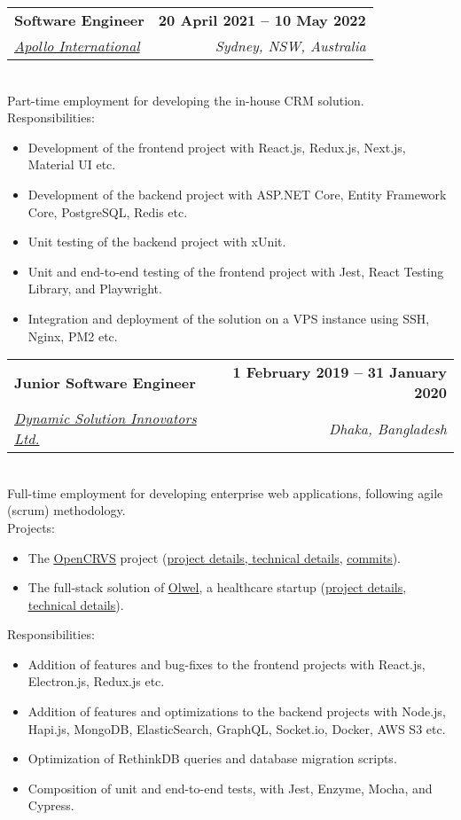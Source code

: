 \documentclass[11pt,a4paper]{article}
\makeatletter
\newcommand{\resumeItem}[1]{
  \item{
    {#1 \vspace{-2pt}}
  }
}
\newcommand{\resumeSubheading}[4]{
  \vspace{-2pt}\item
    \begin{tabular*}{1.0\textwidth}[t]{l@{\extracolsep{\fill}}r}
      \textbf{#1} & \textbf{\small #2} \\
      \textit{\small#3} & \textit{\small #4} \\
    \end{tabular*}\vspace{-7pt}
}
\newcommand{\resumeItemListStart}{\begin{itemize}}
\newcommand{\resumeItemListEnd}{\end{itemize}\vspace{-5pt}}
\makeatother
\begin{document}
    \resumeSubheading
      {Software Engineer}{20 April 2021 -- 10 May 2022}
      {\href{https://www.apollointl.com.au}{Apollo International}}{Sydney, NSW, Australia}
      \\ \vspace{8pt} Part-time employment for developing the in-house CRM solution. \vspace{-4pt}
      \\ \vspace{6pt} Responsibilities: \vspace{-4pt}
      \resumeItemListStart
        \resumeItem{Development of the frontend project with React.js, Redux.js,  Next.js, Material UI etc.}
        \resumeItem{Development of the backend project with ASP.NET Core, Entity Framework Core, PostgreSQL, Redis etc.}
        \resumeItem{Unit testing of the backend project with xUnit.}
        \resumeItem{Unit and end-to-end testing of the frontend project with Jest, React Testing Library, and Playwright.}
        \resumeItem{Integration and deployment of the solution on a VPS instance using SSH, Nginx, PM2 etc.}
      \resumeItemListEnd

    \resumeSubheading
      {Junior Software Engineer}{1 February 2019 -- 31 January 2020}
      {\href{https://www.dsinnovators.com}{Dynamic Solution Innovators Ltd.}}{Dhaka, Bangladesh}
      \\ \vspace{8pt} Full-time employment for developing enterprise web applications, following agile (scrum) methodology. \vspace{-4pt}
      \\ \vspace{6pt} Projects: \vspace{-4pt}
      \resumeItemListStart
      \resumeItem{The \href{https://www.opencrvs.org}{\underline{OpenCRVS}} project (\href{https://www.dsinnovators.com/casestudies/open-crvs-2}{\href{https://www.dsinnovators.com/projects/open-crvs}{\underline{project details}}, \underline{technical details}}, \href{https://github.com/opencrvs/opencrvs-core/commits?author=maacpiash}{\underline{commits}}).}
      \resumeItem{The full-stack solution of \href{https://www.olwel.com}{\underline{Olwel}}, a healthcare startup (\href{https://www.dsinnovators.com/projects/olwel}{\underline{project details}}, \href{https://www.dsinnovators.com/casestudies/olwel-2}{\underline{technical details}}).}
      \resumeItemListEnd
      \vspace{1pt} Responsibilities: \vspace{-4pt}
      \resumeItemListStart
        \resumeItem{Addition of features and bug-fixes to the frontend projects with React.js, Electron.js, Redux.js etc.}
        \resumeItem{Addition of features and optimizations to the backend projects with Node.js, Hapi.js, MongoDB, ElasticSearch, GraphQL, Socket.io, Docker, AWS S3 etc.}
        \resumeItem{Optimization of RethinkDB queries and database migration scripts.}
        \resumeItem{Composition of unit and end-to-end tests, with Jest, Enzyme, Mocha, and Cypress.}
    \resumeItemListEnd
\end{document}
